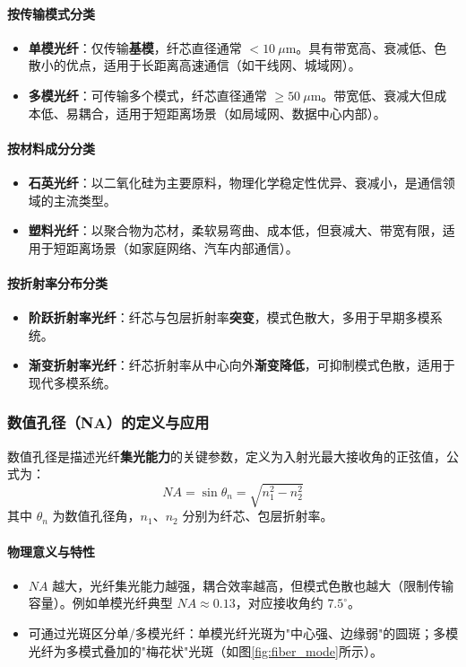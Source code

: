 \documentclass[11pt]{article}
\begin{document}
\paragraph{按传输模式分类}
\begin{itemize}
  \item \textbf{单模光纤}：仅传输\textbf{基模}，纤芯直径通常 $<10\ \mu\text{m}$。具有带宽高、衰减低、色散小的优点，适用于长距离高速通信（如干线网、城域网）。
  \item \textbf{多模光纤}：可传输多个模式，纤芯直径通常 $\geq50\ \mu\text{m}$。带宽低、衰减大但成本低、易耦合，适用于短距离场景（如局域网、数据中心内部）。
\end{itemize}


\paragraph{按材料成分分类}
\begin{itemize}
  \item \textbf{石英光纤}：以二氧化硅为主要原料，物理化学稳定性优异、衰减小，是通信领域的主流类型。
  \item \textbf{塑料光纤}：以聚合物为芯材，柔软易弯曲、成本低，但衰减大、带宽有限，适用于短距离场景（如家庭网络、汽车内部通信）。
\end{itemize}


\paragraph{按折射率分布分类}
\begin{itemize}
  \item \textbf{阶跃折射率光纤}：纤芯与包层折射率\textbf{突变}，模式色散大，多用于早期多模系统。
  \item \textbf{渐变折射率光纤}：纤芯折射率从中心向外\textbf{渐变降低}，可抑制模式色散，适用于现代多模系统。
\end{itemize}


\subsubsection{数值孔径（NA）的定义与应用}
数值孔径是描述光纤\textbf{集光能力}的关键参数，定义为入射光最大接收角的正弦值，公式为：
\begin{equation}\label{eq:NA}
NA = \sin\theta_n = \sqrt{n_1^2 - n_2^2}
\end{equation}
其中 $\theta_n$ 为数值孔径角，$n_1$、$n_2$ 分别为纤芯、包层折射率。

\paragraph{物理意义与特性}
\begin{itemize}
  \item $NA$ 越大，光纤集光能力越强，耦合效率越高，但模式色散也越大（限制传输容量）。例如单模光纤典型 $NA\approx0.13$，对应接收角约 $7.5^\circ$。
  \item 可通过光斑区分单/多模光纤：单模光纤光斑为"中心强、边缘弱"的圆斑；多模光纤为多模式叠加的"梅花状"光斑（如图\ref{fig:fiber_mode}所示）。
\end{itemize}
\end{document}
